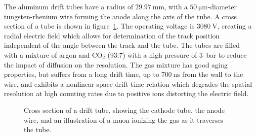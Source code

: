 The aluminum drift tubes have a radius of $\SI{29.97}{\milli\meter}$, with a $\SI{50}{\micro\meter}$-diameter tungsten-rhenium wire forming the anode along the axis of the tube. A cross section of a tube is shown in figure~\ref{fig:ATLAS-MS-MDT-xsec}. The operating voltage is $\SI{3080}{\volt}$, creating a radial electric field which allows for determination of the track position independent of the angle between the track and the tube. The tubes are filled with a mixture of argon and CO$_2$ (93:7) with a high pressure of 3~bar to reduce the impact of diffusion on the resolution. The gas mixture has good aging properties, but suffers from a long drift time, up to $\SI{700}{\nano\second}$ from the wall to the wire, and exhibits a nonlinear space-drift time relation which degrades the spatial resolution at high counting rates due to positive ions distorting the electric field. 

\begin{figure}
	\centering
	\caption{Cross section of a drift tube, showing the cathode tube, the anode wire, and an illustration of a muon ionizing the gas as it traverses the tube.}
	\label{fig:ATLAS-MS-MDT-xsec}
\end{figure}

